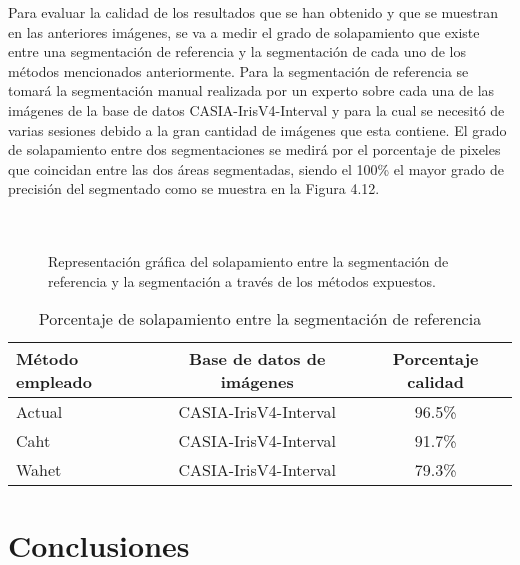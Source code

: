 Para evaluar la calidad de los resultados que se han obtenido y que se muestran en las anteriores imágenes, se va a medir el grado de solapamiento que existe entre una segmentación de referencia y la segmentación de cada uno de los métodos mencionados anteriormente. Para la segmentación de referencia se tomará la segmentación manual realizada por un experto sobre cada una de las imágenes de la base de datos CASIA-IrisV4-Interval y para la cual se necesitó de varias sesiones debido a la gran cantidad de imágenes que esta contiene. El grado de solapamiento entre dos segmentaciones se medirá por el porcentaje de pixeles que coincidan entre las dos áreas segmentadas, siendo el 100\% el mayor grado de precisión del segmentado como se muestra en la Figura 4.12. \\ \\ \\

\begin{figure}[htbp]
\centering
{}
\caption{Representación gráfica del solapamiento entre la segmentación de referencia y la segmentación a través de los métodos expuestos.} \label{fig:señales}
\end{figure}

\begin{table}[h]
\begin{center}
\begin{tabular}{@{}lcc@{}}
\toprule
Método empleado		& Base de datos de imágenes 		& Porcentaje calidad \\ \hline
Actual 			& CASIA-IrisV4-Interval		& 96.5\% \\
Caht 			& CASIA-IrisV4-Interval		& 91.7\% \\
Wahet  		& CASIA-IrisV4-Interval		& 79.3\% \\
\end{tabular}
\end{center}
\caption{Porcentaje de solapamiento entre la segmentación de referencia}
\label{my_tabla}
\end{table}

\begin{table}[htbp]
\begin{center}
\end{center}
\end{table}

\section{Conclusiones}


